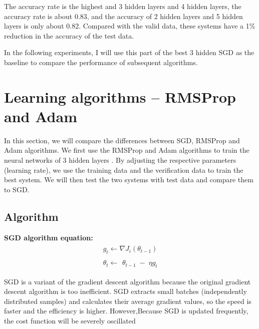\documentclass{article}
\begin{document}
The accuracy rate is the highest and 3 hidden layers and 4 hidden layers, the accuracy rate is about 0.83, and the accuracy of 2 hidden layers and 5 hidden layers is only about 0.82. Compared with the valid data, these systems have a 1\% reduction in the accuracy of the test data.

In the following experiments, I will use this part of the best 3 hidden SGD as the baseline to compare the performance of subsequent algorithms.




\section{Learning algorithms -- RMSProp and Adam}


In this section, we will compare the differences between SGD, RMSProp and Adam algorithms. We first use the RMSProp and Adam algorithms to train the neural networks of 3 hidden layers . By adjusting the respective parameters (learning rate), we use the training data and the verification data to train the best system. We will then test the two systems with test data and compare them to SGD.

\subsection{Algorithm}

\textbf{SGD algorithm equation:}
\begin{equation}\label{sgd}
\begin{aligned}
\begin{array}{l}g_t\leftarrow\nabla J_i\left(\theta_{t-1}\right)\end{array}\\
\begin{array}{l}\theta_t\leftarrow\end{array}\theta_{t-1}\;-\;\eta g_t
\end{aligned}
\end{equation}

SGD is a variant of the gradient descent algorithm because the original gradient descent algorithm is too inefficient. SGD extracts small batches (independently distributed samples) and calculates their average gradient values, so the speed is faster and the efficiency is higher. However,Because SGD is updated frequently, the cost function will be severely oscillated 
\end{document}
